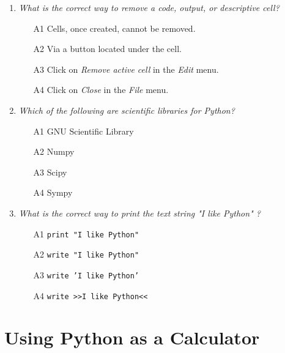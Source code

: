 \begin{enumerate}
\item {\em What is the correct way to remove a code, output, or descriptive cell?}\\

\begin{enumerate}
\item[A1] Cells, once created, cannot be removed.
\item[A2] Via a button located under the cell.
\item[A3] Click on {\em Remove active cell} in the {\em Edit} menu.
\item[A4] Click on {\em Close} in the {\em File} menu.
\end{enumerate}
\vspace{4mm}

\item {\em Which of the following are scientific libraries for Python?}\\

\begin{enumerate}
\item[A1] GNU Scientific Library
\item[A2] Numpy
\item[A3] Scipy
\item[A4] Sympy
\end{enumerate}
\vspace{4mm}

\item {\em What is the correct way to print the text string "I like Python" ?}\\

\begin{enumerate}
\item[A1] {\tt print "I like Python"}
\item[A2] {\tt write "I like Python"} 
\item[A3] {\tt write 'I like Python'} 
\item[A4] {\tt write >>I like Python<<} 
\end{enumerate}
\vspace{4mm}

\end{enumerate}


\section{Using Python as a Calculator}

